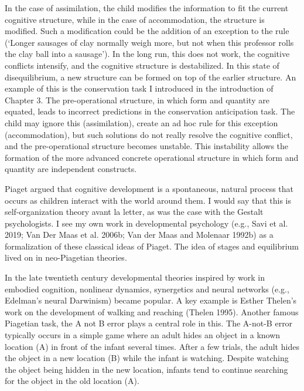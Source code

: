 \documentclass[
  a4paper,
  DIV=11,
  numbers=noendperiod,
  oneside]{scrreprt}
\begin{document}
In the case of assimilation, the child modifies the information to fit
the current cognitive structure, while in the case of accommodation, the
structure is modified. Such a modification could be the addition of an
exception to the rule (`Longer sausages of clay normally weigh more, but
not when this professor rolls the clay ball into a sausage'). In the
long run, this does not work, the cognitive conflicts intensify, and the
cognitive structure is destabilized. In this state of disequilibrium, a
new structure can be formed on top of the earlier structure. An example
of this is the conservation task I introduced in the introduction of
Chapter 3. The pre-operational structure, in which form and quantity are
equated, leads to incorrect predictions in the conservation anticipation
task. The child may ignore this (assimilation), create an ad hoc rule
for this exception (accommodation), but such solutions do not really
resolve the cognitive conflict, and the pre-operational structure
becomes unstable. This instability allows the formation of the more
advanced concrete operational structure in which form and quantity are
independent constructs.

Piaget argued that cognitive development is a spontaneous, natural
process that occurs as children interact with the world around them. I
would say that this is self-organization theory avant la letter, as was
the case with the Gestalt psychologists. I see my own work in
developmental psychology (e.g., Savi et al. 2019; Van Der Maas et al.
2006b; Van der Maas and Molenaar 1992b) as a formalization of these
classical ideas of Piaget. The idea of stages and equilibrium lived on
in neo-Piagetian theories.

In the late twentieth century developmental theories inspired by work in
embodied cognition, nonlinear dynamics, synergetics and neural networks
(e.g., Edelman's neural Darwinism) became popular. A key example is
Esther Thelen's work on the development of walking and reaching (Thelen
1995). Another famous Piagetian task, the A not B error plays a central
role in this. The A-not-B error typically occurs in a simple game where
an adult hides an object in a known location (A) in front of the infant
several times. After a few trials, the adult hides the object in a new
location (B) while the infant is watching. Despite watching the object
being hidden in the new location, infants tend to continue searching for
the object in the old location (A).
\end{document}
